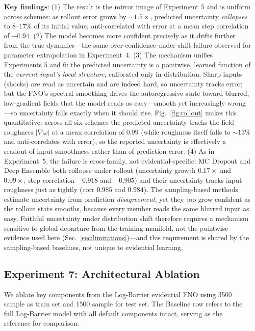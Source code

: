 \textbf{Key findings}: (1) The result is the mirror image of Experiment 5 and is uniform across
schemes: as rollout error grows by $\sim\!1.5\times$, predicted uncertainty \emph{collapses} to
$8$--$17\%$ of its initial value, anti-correlated with error at a mean step correlation of $-0.94$.
(2) The model becomes more confident precisely as it drifts further from the true dynamics---the
same over-confidence-under-shift failure observed for parameter extrapolation in
Experiment~4. (3) The mechanism unifies Experiments 5 and 6: the predicted uncertainty is a
pointwise, learned function of the \emph{current input's local structure}, calibrated only
in-distribution. Sharp inputs (shocks) are read as uncertain and are indeed hard, so uncertainty
tracks error; but the FNO's spectral smoothing drives the autoregressive state toward blurred,
low-gradient fields that the model reads as easy---smooth yet increasingly wrong---so uncertainty
falls exactly when it should rise. Fig.~\ref{fig:rollout} makes this quantitative: across all six
schemes the predicted uncertainty tracks the field roughness $\overline{|\nabla \omega|}$ at a mean
correlation of $0.99$ (while roughness itself falls to $\sim\!13\%$ and anti-correlates with error),
so the reported uncertainty is effectively a readout of input smoothness rather than of prediction
error. (4) As in Experiment~5, the failure is cross-family, not evidential-specific: MC Dropout and
Deep Ensemble both collapse under rollout (uncertainty growth $0.17\times$ and $0.09\times$; step
correlation $-0.918$ and $-0.905$) and their uncertainty tracks input roughness just as tightly
(corr $0.985$ and $0.984$). The sampling-based methods estimate uncertainty from prediction
\emph{disagreement}, yet they too grow confident as the rollout state smooths, because every member
reads the same blurred input as easy. Faithful uncertainty under distribution shift therefore requires
a mechanism sensitive to global departure from the training manifold, not the pointwise evidence
used here (Sec.~\ref{sec:limitations})---and this requirement is shared by the sampling-based
baselines, not unique to evidential learning.

\subsection{Experiment 7: Architectural Ablation}

We ablate key components from the Log-Barrier evidential FNO using 3500 sample as train set and 1500 sample for test set. The Baseline row refers to the full Log-Barrier model with all default components intact, serving as the reference for comparison.

